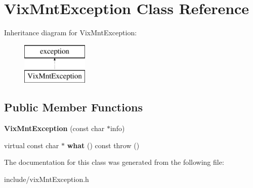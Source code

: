 \hypertarget{class_vix_mnt_exception}{}\section{Vix\+Mnt\+Exception Class Reference}
\label{class_vix_mnt_exception}
Inheritance diagram for Vix\+Mnt\+Exception\+:\begin{figure}[H]
\begin{center}
\leavevmode
\includegraphics[height=2.000000cm]{class_vix_mnt_exception}
\end{center}
\end{figure}
\subsection*{Public Member Functions}
\begin{DoxyCompactItemize}
\item 
\hypertarget{class_vix_mnt_exception_a25d10b76f33ca770e17668137cc4dedf}{}\label{class_vix_mnt_exception_a25d10b76f33ca770e17668137cc4dedf} 
{\bfseries Vix\+Mnt\+Exception} (const char $\ast$info)
\item 
\hypertarget{class_vix_mnt_exception_a8175e2b13440768f947a351edb49895e}{}\label{class_vix_mnt_exception_a8175e2b13440768f947a351edb49895e} 
virtual const char $\ast$ {\bfseries what} () const  throw ()
\end{DoxyCompactItemize}


The documentation for this class was generated from the following file\+:\begin{DoxyCompactItemize}
\item 
include/vix\+Mnt\+Exception.\+h\end{DoxyCompactItemize}
